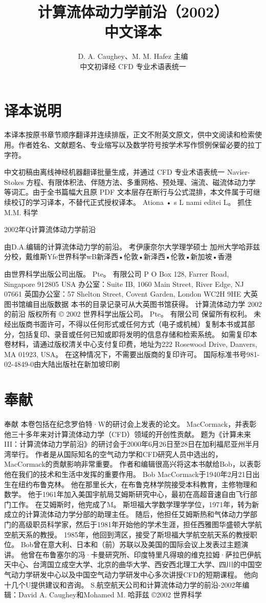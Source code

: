 \documentclass[UTF8,11pt,a4paper,openany,fontset=fandol]{ctexbook}
\title{计算流体动力学前沿（2002）\\[0.45em]\Large 中文译本}
\author{D. A. Caughey、M. M. Hafez 主编\\\small 中文初译经 CFD 专业术语表统一}
\date{}
\begin{document}
\frontmatter
\maketitle
\chapter*{译本说明}
本译本按原书章节顺序翻译并连续排版，正文不附英文原文，供中文阅读和检索使用。作者姓名、文献题名、专业缩写以及数学符号按学术写作惯例保留必要的拉丁字符。

中文初稿由离线神经机器翻译批量生成，并通过 CFD 专业术语表统一 Navier-Stokes 方程、有限体积法、伴随方法、多重网格、预处理、湍流、磁流体动力学等词汇。由于全书篇幅大且原 PDF 文本层存在断行与公式混排，本文件属于可继续校订的学习译本，不替代正式授权译本。
\tableofcontents
\mainmatter
Ationa • s L nami editei L。 抓住M.M. 科学

2002年Q计算流体动力学前沿

由D.A.编辑的计算流体动力学的前沿。 考伊康奈尔大学理学硕士 加州大学哈菲兹分校，戴维斯Yfe世界科学wB新泽西•伦敦•新泽西•伦敦•新加坡•香港

由世界科学出版公司出版。 Pte。 有限公司 P O Box 128, Farrer Road, Singapore 912805 USA 办公室：Suite IB, 1060 Main Street, River Edge, NJ 07661 英国办公室：57 Shelton Street, Covent Garden, London WC2H 9HE 大英图书馆编目出版数据 本书的目录记录可从大英图书馆获得。 计算流体动力学 2002的前沿 版权所有 © 2002 世界科学出版公司。 Pte。 有限公司 保留所有权利。 未经出版商书面许可，不得以任何形式或任何方式（电子或机械）复制本书或其部分，包括复印、录音或任何已知或即将发明的信息存储和检索系统。 如需复印本卷材料，请通过版权清关中心支付复印费，地址为222 Rosewood Drive, Danvers, MA 01923, USA。 在这种情况下，不需要出版商的复印许可。 国际标准书号981-02-4849-0由大陆出版社在新加坡印刷

\chapter*{奉献}
奉献 本卷包括在纪念罗伯特·W的研讨会上发表的论文。 MacCormack，并表彰他三十多年来对计算流体动力学（CFD）领域的开创性贡献。 题为《计算未来III：计算流体动力学前沿》的研讨会于2000年6月26日至28日在加利福尼亚州半月湾举行。 作者是从国际知名的空气动力学和CFD研究人员中选出的，MacCormack的贡献影响非常重要。 作者和编辑很高兴将这本书献给Bob，以表彰他在我们的技术和生活中发挥的重要作用。 Bob MacCormack于1940年2月21日出生在纽约布鲁克林。 他在那里长大，在布鲁克林学院接受本科教育，主修物理和数学。 他于1961年加入美国宇航局艾姆斯研究中心，最初在高超音速自由飞行部门工作。 在艾姆斯时，他完成了M。 斯坦福大学数学理学学位，1971年，转为新成立的计算流体动力学分部的助理主任。 随后，他担任艾姆斯热和气体动力学部门的高级职员科学家，然后于1981年开始他的学术生涯，担任西雅图华盛顿大学航空航天系的教授。 1985年，他回到湾区，接受了斯坦福大学航空航天系的教授职位。 Bob曾在意大利、日本和（前）苏联以及美国的国际会议上发表过主题演讲。 他曾在布鲁塞尔的冯·卡曼研究所、印度特里凡得琅的维克拉姆·萨拉巴伊航天中心、台湾国立成空大学、北京的曲华大学、西安西北理工大学、四川的中国空气动力学研发中心以及中国空气动力学研发中心多次讲授CFD的短期课程。 他向十几个U提供建议和咨询。 S.航空航天公司和计算流体动力学的前沿-2002年编辑：David A. Caughey和Mohamed M. 哈菲兹 ©2002 世界科学
\end{document}
